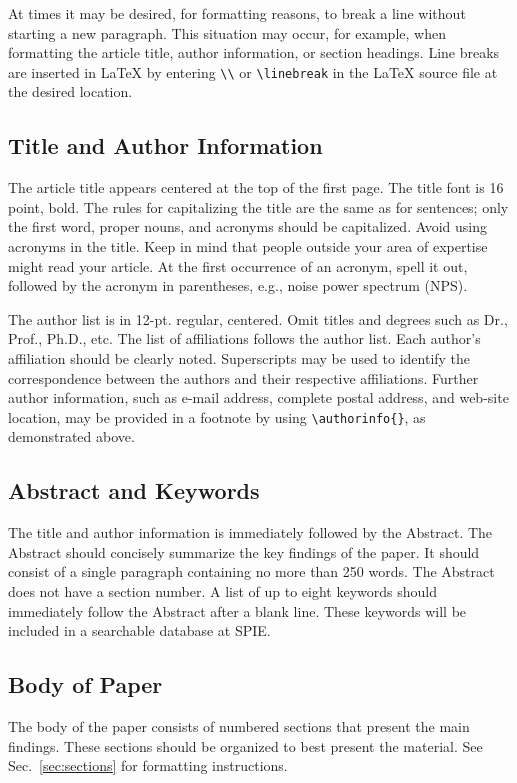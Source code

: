 \documentclass[]{spie}  %
\begin{document}
At times it may be desired, for formatting reasons, to break a line without starting a new paragraph.  This situation may occur, for example, when formatting the article title, author information, or section headings.  Line breaks are inserted in LaTeX by entering \verb|\\| or \verb|\linebreak| in the LaTeX source file at the desired location.  

\subsection{Title and Author Information}
\label{sec:title}

The article title appears centered at the top of the first page.  The title font is 16 point, bold.  The rules for capitalizing the title are the same as for sentences; only the first word, proper nouns, and acronyms should be capitalized.  Avoid using acronyms in the title.  Keep in mind that people outside your area of expertise might read your article. At the first occurrence of an acronym, spell it out, followed by the acronym in parentheses, e.g., noise power spectrum (NPS). 

The author list is in 12-pt. regular, centered. Omit titles and degrees such as Dr., Prof., Ph.D., etc. The list of affiliations follows the author list. Each author's affiliation should be clearly noted. Superscripts may be used to identify the correspondence between the authors and their respective affiliations.  Further author information, such as e-mail address, complete postal address, and web-site location, may be provided in a footnote by using \verb|\authorinfo{}|, as demonstrated above.

\subsection{Abstract and Keywords}
The title and author information is immediately followed by the Abstract. The Abstract should concisely summarize the key findings of the paper.  It should consist of a single paragraph containing no more than 250 words.  The Abstract does not have a section number.  A list of up to eight keywords should immediately follow the Abstract after a blank line.  These keywords will be included in a searchable database at SPIE.

\subsection{Body of Paper}
The body of the paper consists of numbered sections that present the main findings.  These sections should be organized to best present the material.  See Sec.~\ref{sec:sections} for formatting instructions.
\end{document}
